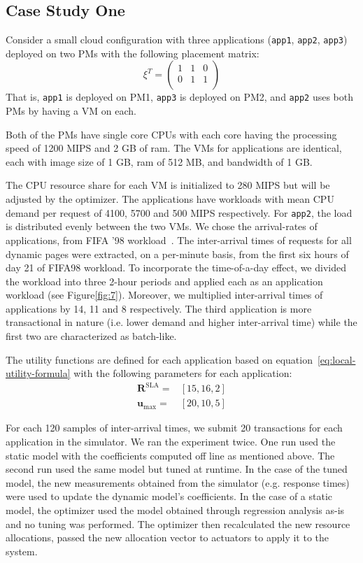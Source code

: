 \subsection{Case Study One}
\label{sec:case-study-test-simple-deploy}
Consider a small cloud configuration with three applications (\texttt{app1}, \texttt{app2}, \texttt{app3}) deployed on two PMs with the following placement matrix:
\[ \xi^T= 
  \left( \begin{array}{ccc}
  1 & 1 & 0 \\
  0 & 1 & 1 \\
\end{array} \right)\] 
That is, \texttt{app1} is deployed on PM1, \texttt{app3} is deployed on PM2, and \texttt{app2} uses both PMs by having a VM on each.

Both of the PMs have single core CPUs with each core having the processing speed of 1200 MIPS and 2 GB of ram. The VMs for applications are identical, each with image size of 1 GB, ram of 512 MB, and bandwidth of 1 GB.

The CPU resource share for each VM is initialized to 280 MIPS but will be adjusted by the optimizer. The applications have workloads with mean CPU demand per request of 4100, 5700 and 500 MIPS respectively. For \texttt{app2}, the load is distributed evenly between the two VMs. We chose the arrival-rates of applications, from FIFA '98 workload~\cite{arlitt_workload_2000}. The inter-arrival times of requests for all dynamic pages were extracted, on a per-minute basis, from the first six hours of day 21 of FIFA98 workload. To incorporate the time-of-a-day effect, we divided the workload into three 2-hour periods and applied each as an application workload (see Figure\ref{fig:7}). Moreover, we multiplied inter-arrival times of applications by 14, 11 and 8 respectively.
The third application is more transactional in nature (i.e. lower demand and higher inter-arrival time) while the first two are characterized as batch-like.

The utility functions are defined for each application based on equation~\ref{eq:local-utility-formula} with the following parameters for each application:
\begin{align*} \textbf{R}^\text{SLA} = & [15,16,2] \\
 \textbf{u}_{\text{max}} = & [20,10,5]      \end{align*}

For each 120 samples of inter-arrival times, we submit 20 transactions for each application in the simulator. 
We ran the experiment twice. One run used the static model with the coefficients computed off line as mentioned above.  The second run used the same model but tuned at runtime.
In the case of the tuned model, the new measurements obtained from the simulator (e.g. response times) were used to update the dynamic model's coefficients.  In the case of a static model, the optimizer used the model obtained through regression analysis as-is and no tuning was performed. The optimizer then recalculated the new resource allocations, passed the new allocation vector to actuators to apply it to the system. 

